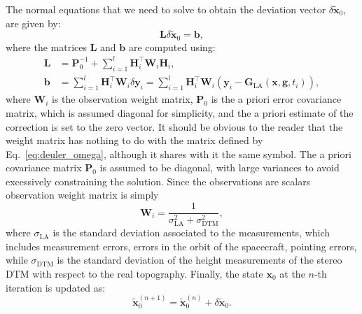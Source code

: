 \documentclass[pdflatex,sn-mathphys-num]{sn-jnl}%
\theoremstyle{thmstyleone}%
\theoremstyle{thmstyletwo}%
\theoremstyle{thmstylethree}%
\renewcommand{\vec}[1]{\boldsymbol{#1}}
\begin{document}
	
	The normal equations that we need to solve to obtain the deviation vector $ \delta\tilde{\vec{x}}_0$, 
	are given by:
	\begin{equation}
		\vec{L}  \delta\tilde{\vec{x}}_0 = \vec{b},
	\end{equation}
	where the matrices \( \vec{L} \) and \( \vec{b} \)  are computed using:
	\begin{align}
		\vec{L} &= 	\vec{P}_0^{-1} + \displaystyle\sum_{i = 1}^{l} \vec{H}_i^\top  \vec{W}_i \vec{H}_i, 
		\\%
		\vec{b} &= 	
		\displaystyle\sum_{i = 1}^{l} \vec{H}_i^\top   \vec{W}_i \delta\vec{y}_i =
		\displaystyle\sum_{i = 1}^{l} \vec{H}_i^\top  \vec{W}_i ( \vec{y}_i -  \vec{G}_{\mathrm{LA}}(	\vec{x},  \vec{g}, t_i)),
	\end{align}
	where $\vec{W}_i $ is the observation weight matrix, $	\vec{P}_0$ is the a priori error covariance matrix, which is assumed diagonal for simplicity, and the a priori estimate of the correction is set to the zero vector. 
	It should be obvious to the reader that the weight matrix has nothing to do with the matrix defined by Eq.~\eqref{eq:deuler_omega}, although it shares with it the same symbol.
	The a priori covariance matrix $\boldsymbol{P}_0$ is assumed to be diagonal, with large variances to avoid excessively constraining the solution.
	Since the observations are scalars observation weight matrix is simply
	\begin{equation}
		\vec{W}_i = \frac{1}{\sigma_{\mathrm{LA}}^2 + \sigma_{\mathrm{DTM}}^2}, 
	\end{equation}
	where $\sigma_{\mathrm{LA}}$ is the standard deviation associated to the measurements, which includes measurement errors, errors in the orbit of the spacecraft, pointing errors, while 
	$\sigma_{\mathrm{DTM}}$ is the standard deviation of the height measurements of the stereo DTM with respect to the real topography.
	Finally, the state \( \vec{x}_0\) at the $n$-th iteration is updated as:	
	\begin{equation}
		\tilde{\vec{x}}_0^{(n+1)}= \tilde{\vec{x}}_0^{(n)} +  \delta\tilde{\vec{x}}_0.
	\end{equation}
	
\end{document}
